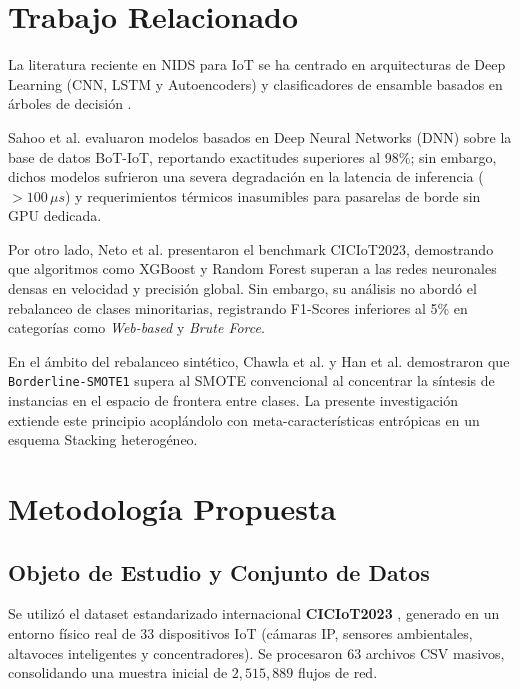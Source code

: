 \documentclass[conference]{IEEEtran}
\begin{document}
\section{Trabajo Relacionado}
La literatura reciente en NIDS para IoT se ha centrado en arquitecturas de Deep Learning (CNN, LSTM y Autoencoders) y clasificadores de ensamble basados en árboles de decisión \cite{Sahoo2023, Ferrag2022}.

Sahoo et al. \cite{Sahoo2023} evaluaron modelos basados en Deep Neural Networks (DNN) sobre la base de datos BoT-IoT, reportando exactitudes superiores al 98\%; sin embargo, dichos modelos sufrieron una severa degradación en la latencia de inferencia ($>100\,\mu s$) y requerimientos térmicos inasumibles para pasarelas de borde sin GPU dedicada.

Por otro lado, Neto et al. \cite{Neto2023} presentaron el benchmark CICIoT2023, demostrando que algoritmos como XGBoost y Random Forest superan a las redes neuronales densas en velocidad y precisión global. Sin embargo, su análisis no abordó el rebalanceo de clases minoritarias, registrando F1-Scores inferiores al 5\% en categorías como \textit{Web-based} y \textit{Brute Force}.

En el ámbito del rebalanceo sintético, Chawla et al. \cite{Chawla2002} y Han et al. \cite{Han2005} demostraron que \texttt{Borderline-SMOTE1} supera al SMOTE convencional al concentrar la síntesis de instancias en el espacio de frontera entre clases. La presente investigación extiende este principio acoplándolo con meta-características entrópicas en un esquema Stacking heterogéneo.

\section{Metodología Propuesta}

\subsection{Objeto de Estudio y Conjunto de Datos}
Se utilizó el dataset estandarizado internacional \textbf{CICIoT2023} \cite{Neto2023}, generado en un entorno físico real de 33 dispositivos IoT (cámaras IP, sensores ambientales, altavoces inteligentes y concentradores). Se procesaron 63 archivos CSV masivos, consolidando una muestra inicial de $2,515,889$ flujos de red.
\end{document}
